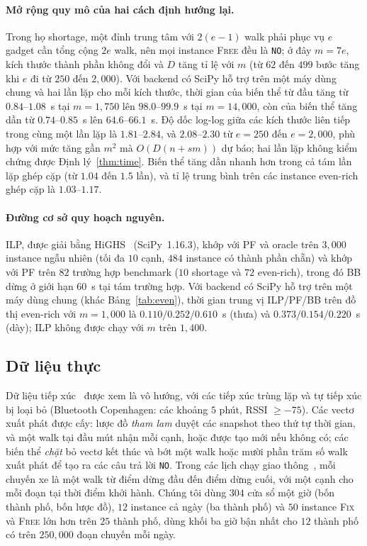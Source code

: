 \documentclass[pdflatex,sn-mathphys-num]{sn-jnl}
\theoremstyle{thmstyleone}
\theoremstyle{thmstyletwo}
\theoremstyle{thmstylethree}
\newcommand{\FIX}{\textup{\textsc{Fix}}}
\newcommand{\FREE}{\textup{\textsc{Free}}}
\newcommand{\NO}{\texttt{NO}}
\begin{document}
\paragraph{Mở rộng quy mô của hai cách định hướng lại.}
Trong họ shortage, một đỉnh trung tâm với $2(e-1)$ walk phải phục vụ $e$ gadget cần tổng cộng $2e$ walk, nên mọi instance \FREE{} đều là \NO{}; ở đây $m=7e$, kích thước thành phần không đổi và $D$ tăng tỉ lệ với $m$ (từ $62$ đến $499$ bước tăng khi $e$ đi từ $250$ đến $2{,}000$). Với backend có SciPy hỗ trợ trên một máy dùng chung và hai lần lặp cho mỗi kích thước, thời gian của biến thể từ đầu tăng từ $0.84$--$1.08$~s tại $m=1{,}750$ lên $98.0$--$99.9$~s tại $m=14{,}000$, còn của biến thể tăng dần từ $0.74$--$0.85$~s lên $64.6$--$66.1$~s. Độ dốc log-log giữa các kích thước liên tiếp trong cùng một lần lặp là $1.81$--$2.84$, và $2.08$--$2.30$ từ $e=250$ đến $e=2{,}000$, phù hợp với mức tăng gần $m^2$ mà $O(D(n+sm))$ dự báo; hai lần lặp không kiểm chứng được Định lý~\ref{thm:time}. Biến thể tăng dần nhanh hơn trong cả tám lần lặp ghép cặp (từ $1.04$ đến $1.5$ lần), và tỉ lệ trung bình trên các instance even-rich ghép cặp là $1.03$--$1.17$.

\paragraph{Đường cơ sở quy hoạch nguyên.} ILP, được giải bằng HiGHS~\cite{huangfu2018} (SciPy~1.16.3), khớp với PF và oracle trên $3{,}000$ instance ngẫu nhiên (tối đa $10$ cạnh, $484$ instance có thành phần chẵn) và khớp với PF trên $82$ trường hợp benchmark ($10$ shortage và $72$ even-rich), trong đó BB dừng ở giới hạn $60$~s tại tám trường hợp. Với backend có SciPy hỗ trợ trên một máy dùng chung (khác Bảng~\ref{tab:even}), thời gian trung vị ILP/PF/BB trên đồ thị even-rich với $m=1{,}000$ là $0.110/0.252/0.610$~s (thưa) và $0.373/0.154/0.220$~s (dày); ILP không được chạy với $m$ trên $1{,}400$.

\subsection{Dữ liệu thực}

Dữ liệu tiếp xúc~\cite{sapiezynski2019,stehle2011,fournet2014,mastrandrea2015,vanhems2013} được xem là vô hướng, với các tiếp xúc trùng lặp và tự tiếp xúc bị loại bỏ (Bluetooth Copenhagen: các khoảng $5$ phút, RSSI $\ge-75$). Các vectơ xuất phát được cấy: lược đồ \emph{tham lam} duyệt các snapshot theo thứ tự thời gian, và một walk tại đầu mút nhận mỗi cạnh, hoặc được tạo mới nếu không có; các biến thể \emph{chặt} bỏ vectơ kết thúc và bớt một walk hoặc mười phần trăm số walk xuất phát để tạo ra các câu trả lời \NO{}. Trong các lịch chạy giao thông~\cite{kujala2018}, mỗi chuyến xe là một walk từ điểm dừng đầu đến điểm dừng cuối, với một cạnh cho mỗi đoạn tại thời điểm khởi hành. Chúng tôi dùng $304$ cửa sổ một giờ (bốn thành phố, bốn lược đồ), $12$ instance cả ngày (ba thành phố) và $50$ instance \FIX{} và \FREE{} lớn hơn trên $25$ thành phố, dùng khối ba giờ bận nhất cho $12$ thành phố có trên $250{,}000$ đoạn chuyến mỗi ngày.
\end{document}
